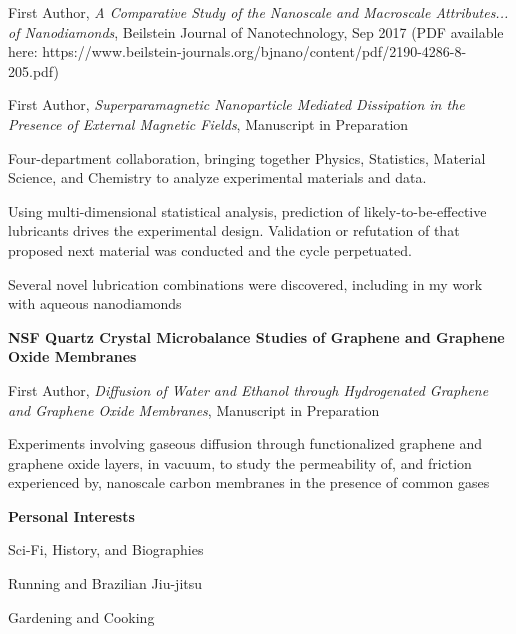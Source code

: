 \documentclass[letterpaper,final]{memoir}
\newcommand{\Sep}{\vspace{1.0em}}
\newcommand{\SmallSep}{\vspace{0.4em}}
\newcommand{\CVSection}[1]
	{\LARGE\textbf{#1}\par
	\SmallSep\normalsize}
\newcommand{\CVItem}[1]
	{\textbf{\color{Blue} #1}}
\begin{document}
\SmallSep

\begin{compactitem}[\color{Blue}$\circ$]
	
       
    \item First Author, \textit{A Comparative Study of the Nanoscale and Macroscale Attributes... of Nanodiamonds}, Beilstein Journal of Nanotechnology, Sep 2017 (PDF available here: https://www.beilstein-journals.org/bjnano/content/pdf/2190-4286-8-205.pdf)
    \SmallSep

    \item First Author, \textit{Superparamagnetic Nanoparticle Mediated Dissipation in the Presence of External Magnetic Fields}, Manuscript in Preparation
    \SmallSep

    \item Four-department collaboration, bringing together Physics, Statistics, Material Science, and Chemistry to analyze experimental
            materials and data. 
    \SmallSep

    \item Using multi-dimensional statistical analysis, prediction of likely-to-be-effective lubricants drives the experimental design.
            Validation or refutation of that proposed next material was conducted and the cycle perpetuated. 
    \SmallSep
            
    \item Several novel lubrication combinations were discovered, including in my
            work with aqueous nanodiamonds
	
	
\end{compactitem}

\Sep

\CVItem{NSF Quartz Crystal Microbalance Studies of Graphene and Graphene Oxide Membranes} 

\SmallSep

\begin{compactitem}[\color{Blue}$\circ$]
    
    \item First Author, \textit{Diffusion of Water and Ethanol through Hydrogenated Graphene and Graphene Oxide Membranes}, 
                    Manuscript in Preparation
    
    
    \SmallSep

    \item Experiments involving gaseous diffusion through functionalized graphene and graphene oxide layers, in vacuum,
    to study the permeability of, and friction experienced by, nanoscale carbon membranes in the presence of common gases
	
\end{compactitem}


\Sep


\notoserif \CVSection{Personal Interests}
\normalfont


\begin{multicols}{3}
	\begin{compactitem}
		
		\item Sci-Fi, History, and Biographies
		\item Running and Brazilian Jiu-jitsu
        \item Gardening and Cooking
			
	\end{compactitem}
\end{multicols}
\end{document}

